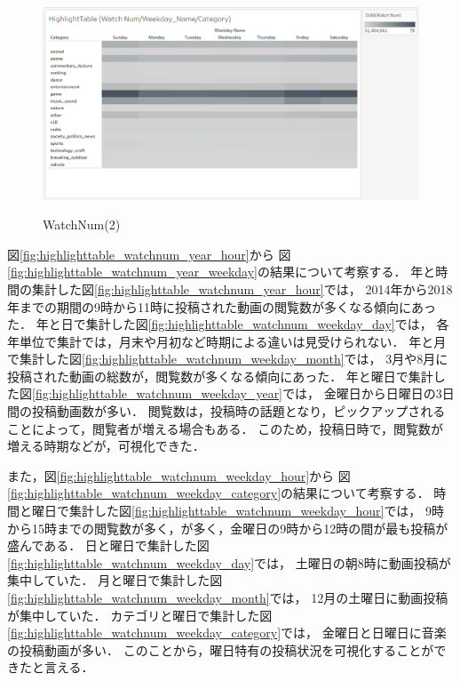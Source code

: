 \documentclass[submit,techrep,noauthor]{ipsj}
\begin{document}
\begin{figure}[h]
\begin{minipage}[b]{0.49\columnwidth}
    \label{fig:highlighttable_watchnum_weekday_month}
  \end{minipage}
  \begin{minipage}[b]{0.49\columnwidth}
    \centering
    \includegraphics[width=\columnwidth]{./eps/HighlightTable_WatchNum_WeekdayNameCategory.eps}
    \label{fig:highlighttable_watchnum_weekday_category}
  \end{minipage}
\vspace{-1.0zh}
  \caption{WatchNum(2)}
  \label{fig:highlighttable_watchnum_weekdayname}
\end{figure}
\vspace{-1.5zh}

図\ref{fig:highlighttable_watchnum_year_hour}から
図\ref{fig:highlighttable_watchnum_year_weekday}の結果について考察する．
%
年と時間の集計した図\ref{fig:highlighttable_watchnum_year_hour}では，
2014年から2018年までの期間の9時から11時に投稿された動画の閲覧数が多くなる傾向にあった．
%
年と日で集計した図\ref{fig:highlighttable_watchnum_weekday_day}では，
各年単位で集計では，月末や月初など時期による違いは見受けられない．
%
年と月で集計した図\ref{fig:highlighttable_watchnum_weekday_month}では，
3月や8月に投稿された動画の総数が，閲覧数が多くなる傾向にあった．
%
年と曜日で集計した図\ref{fig:highlighttable_watchnum_weekday_year}では，
金曜日から日曜日の3日間の投稿動画数が多い．
%
閲覧数は，投稿時の話題となり，ピックアップされることによって，閲覧者が増える場合もある．
このため，投稿日時で，閲覧数が増える時期などが，可視化できた．

また，図\ref{fig:highlighttable_watchnum_weekday_hour}から
図\ref{fig:highlighttable_watchnum_weekday_category}の結果について考察する．
%
時間と曜日で集計した図\ref{fig:highlighttable_watchnum_weekday_hour}では，
9時から15時までの閲覧数が多く，が多く，金曜日の9時から12時の間が最も投稿が盛んである．
%
日と曜日で集計した図\ref{fig:highlighttable_watchnum_weekday_day}では，
土曜日の朝8時に動画投稿が集中していた．
%
月と曜日で集計した図\ref{fig:highlighttable_watchnum_weekday_month}では，
12月の土曜日に動画投稿が集中していた．
%
カテゴリと曜日で集計した図\ref{fig:highlighttable_watchnum_weekday_category}では，
金曜日と日曜日に音楽の投稿動画が多い．
%
このことから，曜日特有の投稿状況を可視化することができたと言える．
\end{document}

